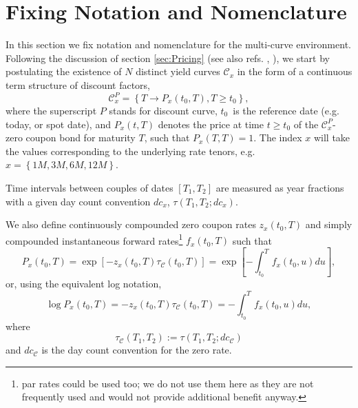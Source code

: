 \documentclass[11pt,reqno]{amsart}
\begin{document}
\section{Fixing Notation and Nomenclature}
\label{sec:Math}
In this section we fix notation and nomenclature for the multi-curve environment. Following the discussion of section \ref{sec:Pricing} (see also refs. \cite{Bia09}, \cite{Mer09}), we start by postulating the existence of $N$ distinct yield curves $\mathcal{C}_{x}$ in the form of a continuous term structure of discount factors,
\begin{equation}
\mathcal{C}_x^P=\left\{ T\longrightarrow P_{x}\left( t_{0},T\right) ,T\geq t_{0}\right\},
\label{eqn:DiscountCurve}
\end{equation}
where the superscript $P$ stands for discount curve, $t_{0}$\ is the reference date (e.g. today, or spot date), and $P_{x}\left(t,T\right)$ denotes the price at time $t\geq t_{0}$ of the $\mathcal{C}_x^P$-zero coupon bond for maturity $T$, such that $P_{x}\left( T,T\right) =1$. The index $x$ will take the values corresponding to the underlying rate tenors, e.g. $x=\left\{1M,3M,6M,12M\right\}$.
\par
Time intervals between couples of dates $\left[T_1,T_2\right]$ are measured as year fractions with a given day count convention $dc_x$, $\tau\left(T_1,T_2;dc_x\right)$.
\par
We also define continuously compounded zero coupon rates $z_x(t_0,T)$ and simply compounded instantaneous forward rates\footnote{par rates could be used too; we do not use them here as they are not frequently used and would not provide additional benefit anyway.} $f_x(t_0,T)$ such that
\begin{equation}
P_x(t_0,T)
    = \exp\left[-z_x\left(t_0,T\right)\tau_{\mathcal{C}}\left(t_0,T\right)\right]
    = \exp\left[-\int_{t_0}^T f_x\left(t_0,u\right)du\right],
\label{eqn:relationship}
\end{equation}
or, using the equivalent log notation,
\begin{equation}
\log P_x(t_0,T)
    = -z_x\left(t_0,T\right)\tau_{\mathcal{C}}\left(t_0,T\right)
    = -\int_{t_0}^T f_x\left(t_0,u\right)du,
\label{eqn:logrelationship}
\end{equation}
where
\begin{equation}
\tau_{\mathcal{C}}\left(T_1,T_2\right) := \tau\left(T_1,T_2;dc_{\mathcal{C}}\right)
\label{eqn:yfZeroRate}
\end{equation}
and $dc_{\mathcal{C}}$ is the day count convention for the zero rate.
\end{document}
